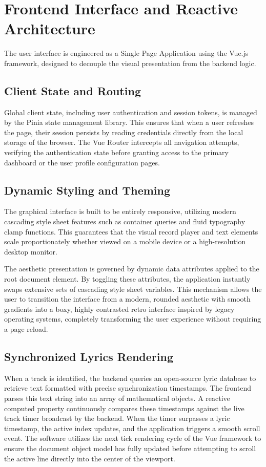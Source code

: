 \documentclass[12pt,a4paper,english]{report}
\begin{document}
\section{Frontend Interface and Reactive Architecture}

The user interface is engineered as a Single Page Application using the Vue.js framework, designed to decouple the visual presentation from the backend logic.

\subsection{Client State and Routing}

Global client state, including user authentication and session tokens, is managed by the Pinia state management library. This ensures that when a user refreshes the page, their session persists by reading credentials directly from the local storage of the browser. The Vue Router intercepts all navigation attempts, verifying the authentication state before granting access to the primary dashboard or the user profile configuration pages.

\subsection{Dynamic Styling and Theming}

The graphical interface is built to be entirely responsive, utilizing modern cascading style sheet features such as container queries and fluid typography clamp functions. This guarantees that the visual record player and text elements scale proportionately whether viewed on a mobile device or a high-resolution desktop monitor. 

The aesthetic presentation is governed by dynamic data attributes applied to the root document element. By toggling these attributes, the application instantly swaps extensive sets of cascading style sheet variables. This mechanism allows the user to transition the interface from a modern, rounded aesthetic with smooth gradients into a boxy, highly contrasted retro interface inspired by legacy operating systems, completely transforming the user experience without requiring a page reload.

\subsection{Synchronized Lyrics Rendering}

When a track is identified, the backend queries an open-source lyric database to retrieve text formatted with precise synchronization timestamps. The frontend parses this text string into an array of mathematical objects. A reactive computed property continuously compares these timestamps against the live track timer broadcast by the backend. When the timer surpasses a lyric timestamp, the active index updates, and the application triggers a smooth scroll event. The software utilizes the next tick rendering cycle of the Vue framework to ensure the document object model has fully updated before attempting to scroll the active line directly into the center of the viewport.
\end{document}
